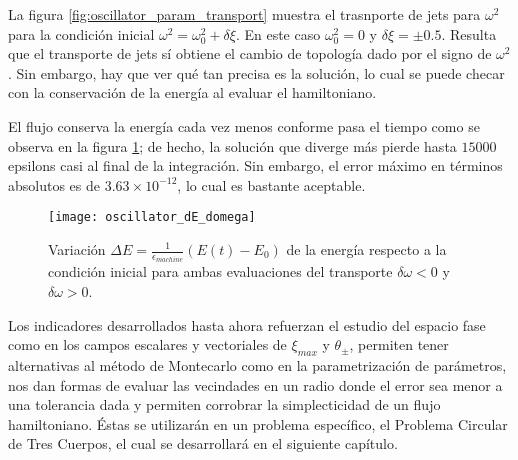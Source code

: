 La figura \ref{fig:oscillator_param_transport} muestra el trasnporte de jets para $\omega^2$ para la condición inicial $\omega^2 = \omega_0^2 + \delta \xi$. En este caso $\omega_0^2 = 0$ y $\delta\xi = \pm 0.5$. Resulta que el transporte de jets sí obtiene el cambio de topología dado por el signo de $\omega^2$. Sin embargo, hay que ver qué tan precisa es la solución, lo cual se puede checar con la conservación de la energía al evaluar el hamiltoniano. 

El flujo conserva la energía cada vez menos conforme pasa el tiempo como se observa en la figura \ref{fig:oscillator_dE_domega}; de hecho, la solución que diverge más pierde hasta $15000$ epsilons casi al final de la integración. Sin embargo, el error máximo en términos absolutos es de $3.63 \times 10^{-12}$, lo cual es bastante aceptable.

\begin{figure}[h!]
 \centering
 \texttt{[image: oscillator\_dE\_domega]}
 \caption{Variación $\Delta E = \frac{1}{\epsilon_{machine}} \left( E(t) - E_0 \right)$ de la energía respecto a la condición inicial para ambas evaluaciones del transporte $\delta \omega < 0$ y $\delta \omega > 0$.}
 \label{fig:oscillator_dE_domega}
\end{figure}


Los indicadores desarrollados hasta ahora refuerzan el estudio del espacio fase como en los campos escalares y vectoriales de $\xi_{max}$ y $\theta_{\pm}$, permiten tener alternativas al método de Montecarlo como en la parametrización de parámetros, nos dan formas de evaluar las vecindades en un radio donde el error sea menor a una tolerancia dada y permiten corrobrar la simplecticidad de un flujo hamiltoniano. Éstas se utilizarán en un problema específico, el Problema Circular de Tres Cuerpos, el cual se desarrollará en el siguiente capítulo.
